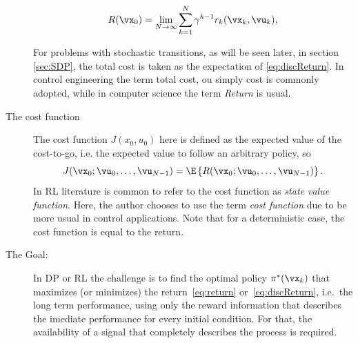 \begin{description}
      \begin{equation}
        R(\vx_0) = \lim_{N\to\infty}\sum_{k=1}^N \gamma^{k-1} r_k(\vx_k,\vu_k)
      \label{eq:discReturn},
      \end{equation}

      For problems with stochastic transitions, as will be seen later, in section \eqref{sec:SDP}, the total cost is taken as the expectation of \eqref{eq:discReturn}.
      In control engineering the term total cost, ou simply cost is commonly adopted, while in computer science the term \textit{Return} is usual.

    \item[The cost function] The cost function $J(x_0,u_0)$ here is defined as the expected value of the cost-to-go, i.e. the expected value to follow an arbitrary policy, so
      \begin{equation}
        J(\vx_0;\vu_0, \dots, \vu_{N-1}) = \E\left\{ R(\vx_0;\vu_0, \dots, \vu_{N-1}) \right\}
      \label{eq:cost_fun_return}.
      \end{equation}
      In RL literature is common to refer to the cost function as \textit{state value function}. Here, the author chooses to use the term \textit{cost function } due to be more usual in control applications.
      Note that for a deterministic case, the cost function is equal to the return.

    \item[The Goal:] In DP or RL the challenge is to find the optimal policy $\pi^*(\vx_k)$ that maximizes (or minimizes) the return~\eqref{eq:return} or~\eqref{eq:discReturn}, i.e.\ the long term performance, using only the reward information that describes the imediate performance for every initial condition.
      For that, the availability of a signal that completely describes the process is required. 
  \end{description}


